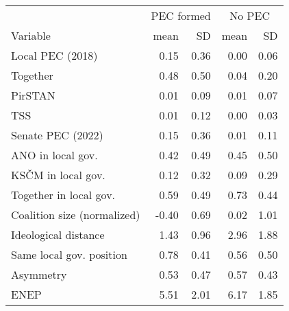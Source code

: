 
\begin{tabular}{l|rr|rr}
& \multicolumn{2}{c|}{PEC formed} & \multicolumn{2}{c}{No PEC} \\
Variable & mean & SD & mean & SD\\
\hline
Local PEC (2018) & 0.15 & 0.36 & 0.00 & 0.06\\
\hline
Together & 0.48 & 0.50 & 0.04 & 0.20\\
\hline
PirSTAN & 0.01 & 0.09 & 0.01 & 0.07\\
\hline
TSS & 0.01 & 0.12 & 0.00 & 0.03\\
\hline
Senate PEC (2022) & 0.15 & 0.36 & 0.01 & 0.11\\
\hline
ANO in local gov. & 0.42 & 0.49 & 0.45 & 0.50\\
\hline
KSČM in local gov. & 0.12 & 0.32 & 0.09 & 0.29\\
\hline
Together in local gov. & 0.59 & 0.49 & 0.73 & 0.44\\
\hline
Coalition size (normalized) & -0.40 & 0.69 & 0.02 & 1.01\\
\hline
Ideological distance & 1.43 & 0.96 & 2.96 & 1.88\\
\hline
Same local gov. position & 0.78 & 0.41 & 0.56 & 0.50\\
\hline
Asymmetry & 0.53 & 0.47 & 0.57 & 0.43\\
\hline
ENEP & 5.51 & 2.01 & 6.17 & 1.85\\
\hline
\end{tabular}
